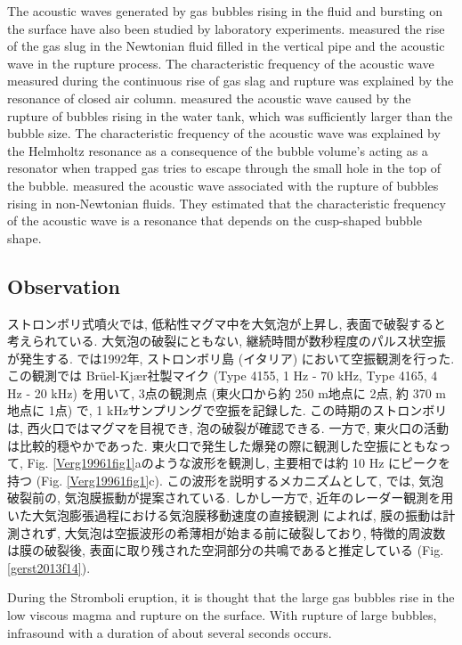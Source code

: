 \documentclass[12pt]{article}
\begin{document}
The acoustic waves generated by gas bubbles rising in the fluid and bursting on the surface have also been studied by laboratory experiments.
\cite{James2004} measured the rise of the gas slug in the Newtonian fluid filled in the vertical pipe and the acoustic wave in the rupture process. 
The characteristic frequency of the acoustic wave measured during the continuous rise of gas slag and rupture was explained by the resonance of closed air column.
\cite{Spiel 1992} measured the acoustic wave caused by the rupture of bubbles rising in the water tank, which was sufficiently larger than the bubble size.
The characteristic frequency of the acoustic wave was explained by the Helmholtz resonance as a consequence of the bubble volume's acting as a resonator when trapped gas tries to escape through the small hole in the top of the bubble.
\cite{Divoux 2008} measured the acoustic wave associated with the rupture of bubbles rising in non-Newtonian fluids.
They estimated that the characteristic frequency of the acoustic wave is a resonance that depends on the cusp-shaped bubble shape.

\subsection{Observation}\label{AcoinObs}

ストロンボリ式噴火では, 低粘性マグマ中を大気泡が上昇し, 表面で破裂すると考えられている. 大気泡の破裂にともない, 継続時間が数秒程度のパルス状空振が発生する.
\cite{Vergniolle1996b} では1992年, ストロンボリ島 (イタリア) において空振観測を行った. この観測では Br\"uel-Kj\ae r社製マイク (Type 4155, 1 Hz - 70 kHz, Type 4165, 4 Hz - 20 kHz) を用いて, 3点の観測点 (東火口から約 250 m地点に 2点, 約 370 m地点に 1点) で, 1 kHzサンプリングで空振を記録した. 
この時期のストロンボリは, 西火口ではマグマを目視でき, 泡の破裂が確認できる. 一方で, 東火口の活動は比較的穏やかであった. 
東火口で発生した爆発の際に観測した空振にともなって, Fig. \ref{Verg19961fig1}aのような波形を観測し, 主要相では約 10 Hz にピークを持つ (Fig. \ref{Verg19961fig1}c). この波形を説明するメカニズムとして, \cite{Vergniolle1996c} では, 気泡破裂前の, 気泡膜振動が提案されている. 
しかし一方で, 近年のレーダー観測を用いた大気泡膨張過程における気泡膜移動速度の直接観測   \citep{Gerst2013a} によれば, 膜の振動は計測されず, 大気泡は空振波形の希薄相が始まる前に破裂しており, 特徴的周波数は膜の破裂後, 表面に取り残された空洞部分の共鳴であると推定している (Fig. \ref{gerst2013f14}).


During the Stromboli eruption, it is thought that the large gas bubbles rise in the low viscous magma and rupture on the surface.
With rupture of large bubbles, infrasound with a duration of about several seconds occurs.
\end{document}
